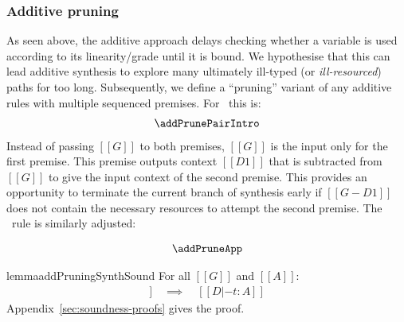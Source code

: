 \subsubsection{Additive pruning}
%
As seen above, the additive approach delays checking
whether a variable is used according to its linearity/grade
until it is bound. We hypothesise that this can lead additive synthesis to explore
many ultimately ill-typed (or \emph{ill-resourced})
paths for too long. Subsequently, we define a ``pruning''
variant of any additive rules with multiple sequenced
premises. For \addPairIntroName\ this is:
%
\begin{align*}
  \begin{array}{c}
    \addPrunePairIntro
  \end{array}
\end{align*}
%
Instead of passing $[[G]]$ to both
premises, $[[G]]$ is the input only for
the first premise. This premise outputs context $[[D1]]$ that
is subtracted from $[[G]]$ to give the input context
of the second premise. This provides an opportunity to
terminate the current branch of synthesis early if $[[ G - D1
]]$ does not contain the necessary resources to attempt the
second premise.
The \addAppName\ rule is similarly adjusted:

\begin{align*}
  \begin{array}{c}
    \addPruneApp
  \end{array}
\end{align*}

\begin{restatable}{lemma}{addPruningSynthSound}
\label{lemma:addPruningSynthSound} For all $[[ G ]]$ and $[[ A ]]$:
%
\begin{align*}
[[ G |- A =>+ t ; D ]] \quad \implies \quad [[ D |- t : A ]]
\end{align*}
Appendix~\ref{sec:soundness-proofs} gives the proof.
\end{restatable}